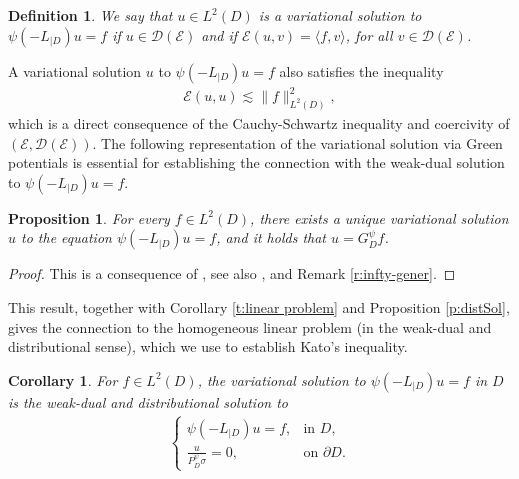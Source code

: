 \documentclass[12pt,a4paper,onecolumn]{article}
\newtheorem{prop}[thm]{Proposition}
\newtheorem{cor}[thm]{Corollary}
\newtheorem{defn}[thm]{Definition}
\theoremstyle{definition}
\newcommand{\1}{\mathbf 1}
\newcommand{\la}{\langle}
\newcommand{\ra}{\rangle}
\newcommand{\EE}{\mathcal{E}}
\newcommand{\DD}{\mathcal{D}}
\newcommand{\Lo}{\psi(-L_{|D})}
\newcommand{\GDP}{G_D^\psi}
\newcommand{\PDS}{P^{\psi}_{ D}}
\numberwithin{equation}{section}
\begin{document}
\begin{defn}
    We say that $u\in L^2(D)$ is a variational solution to $\Lo u=f$ if $u\in \DD(\EE)$ and if $\EE(u,v)=\la f,v \ra$, for all $v\in \DD(\EE)$.
\end{defn}
A variational solution  $u$ to  $\Lo u=f$ also satisfies the inequality
\begin{align*}
	\EE(u,u)\lesssim \|f\|^2_{L^2(D)},
\end{align*}
which is a direct consequence of the Cauchy-Schwartz inequality and coercivity of $(\EE,\DD(\EE))$.  The following representation of the variational solution via Green potentials is essential for establishing the connection with the weak-dual solution to $\Lo u=f$.
\begin{prop}\label{p:varSol}
    For every $f\in L^2(D)$, there exists a unique variational solution $u$ to the equation $\Lo u=f$, and it holds that $u=\GDP f$.
\end{prop}
\begin{proof}
     This is a consequence of \cite[Theorem 1.5.4.]{FOT}, see also \cite[Theorem 1.5.2.]{FOT}, and Remark \ref{r:infty-gener}.
    
   
\end{proof}
This result, together with Corollary \ref{t:linear problem} and Proposition \ref{p:distSol}, gives the connection to the homogeneous linear problem (in the weak-dual and distributional sense), which we use to establish Kato's inequality.

\begin{cor}

    For $f\in L^2(D)$, the variational solution to $\Lo u=f$ in $D$ is the weak-dual and distributional solution to 
    \begin{align}\label{eq: homogeneous}
         \begin{cases}
         \Lo u=f,& \text{in $D$,}\\
         \frac{u}{\PDS\sigma}=0,&\text{on $\partial D$}.
    \end{cases}
     \end{align}
\end{cor}
\end{document}
